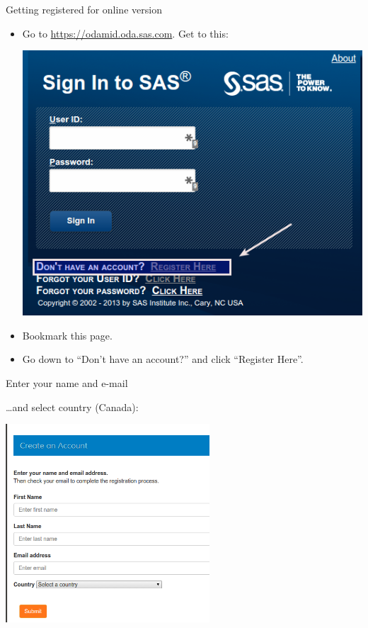 \documentclass[unknownkeysallowed]{beamer}\usepackage[]{graphicx}\usepackage[]{color}
\begin{document}
\begin{frame}[fragile]{Getting registered for online version}

  \begin{itemize}
  \item Go to \url{https://odamid.oda.sas.com}. Get to this:

\includegraphics[height=0.6\textheight]{sas1}

\item Bookmark this page.
\item Go down to ``Don't have an account?'' and click ``Register Here''.
  \end{itemize}
  
\end{frame}

\begin{frame}[fragile]{Enter your name and e-mail}

\ldots and select country (Canada):

\includegraphics[width=3in]{sas2}
  
\end{frame}
\end{document}
